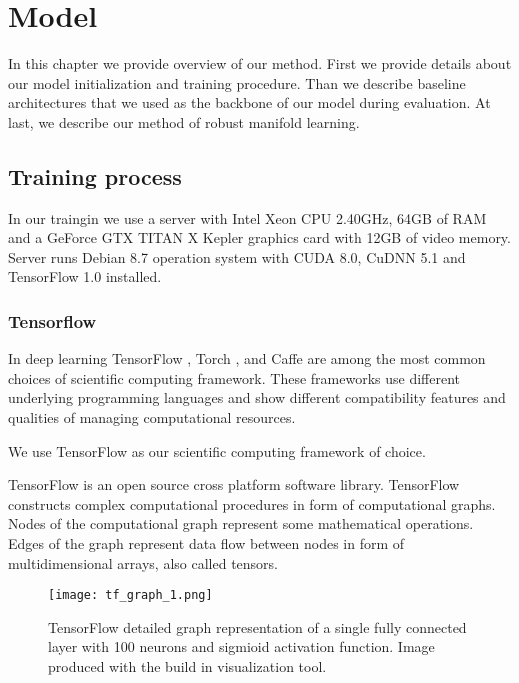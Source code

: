 
\chapter{Model}

In this chapter we provide overview of our method.
First we provide details about our model initialization and training procedure.
Than we describe baseline architectures that we used as the backbone of our model during evaluation.
At last, we describe our method of robust manifold learning.


\label{ch:mode}

\section{Training process}

In our traingin we use a server with Intel Xeon CPU 2.40GHz, 64GB of RAM and a GeForce GTX TITAN X Kepler graphics card with 12GB of video memory. Server runs Debian 8.7 operation system with CUDA 8.0, CuDNN 5.1 and TensorFlow 1.0 installed.

\subsection{Tensorflow}

In deep learning TensorFlow \cite{GoogleResearch2015, Abadi2016}, Torch \cite{torch}, and Caffe \cite{jia2014caffe} are among the most common choices of scientific computing framework.
These frameworks use different underlying programming languages and show different compatibility features and qualities of managing computational resources.

We use TensorFlow as our scientific computing framework of choice.

TensorFlow is an open source cross platform software library.
TensorFlow constructs complex computational procedures in form of computational graphs.
Nodes of the computational graph represent some mathematical operations.
Edges of the graph represent data flow between nodes in form of multidimensional arrays, also called tensors.

\begin{figure}[h!]
  \centering
    \texttt{[image: tf\_graph\_1.png]}
  \caption{TensorFlow detailed graph representation of a single fully connected layer with 100 neurons and sigmioid activation function. Image produced with the build in visualization tool.}
  \label{fig:tf_graph}
\end{figure}

